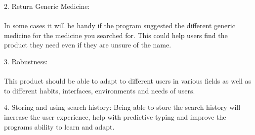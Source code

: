 \documentclass[a4paper,10pt]{article}
\begin{document}
	2.	Return Generic Medicine:\\\\
	In some cases it will be handy if the program suggested the different generic medicine for the medicine you searched for. This could help users find the product they need even if they are unsure of the name.
	
	3.	Robustness:\\\\
	This product should be able to adapt to different users in various fields as well as to different habits, interfaces, environments and needs of users.  
	
	4.	Storing and using search history: 
	Being able to store the search history will increase the user experience, help with predictive typing and improve the programs ability to learn and adapt.

	
\end{document}
